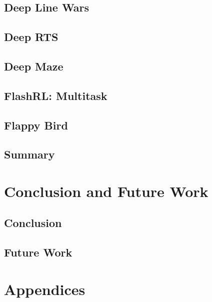 \documentclass{uia}
\begin{document}
\section{Deep Line Wars}

\section{Deep RTS}

\section{Deep Maze}

\section{FlashRL: Multitask}

\section{Flappy Bird}

\section{Summary}

\chapter{Conclusion and Future Work}
\label{chap:conclusion}

\section{Conclusion}
\label{sec:conclusion}

\section{Future Work}
\label{sec:conclusion:future_work}

\cleardoublepage
\renewcommand{\bibname}{References}





\appendix
\chapter*{Appendices}
\renewcommand{\thesection}{\Alph{section}}
\end{document}
